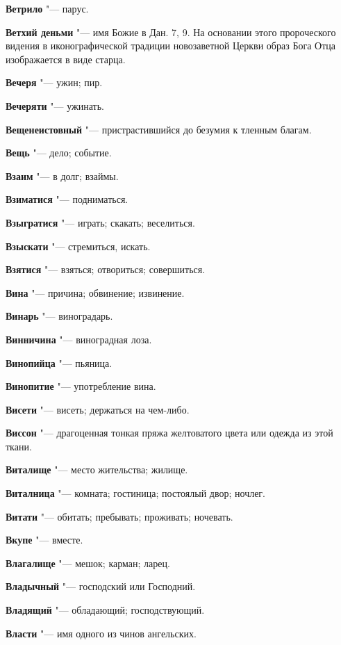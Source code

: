 \begin{mymulticols}
\noindent\textbf{Ветрило} "--- парус. 

\noindent\textbf{Ветхий деньми} "--- имя Божие в Дан. 7, 9. На основании этого пророческого видения в иконографической традиции новозаветной Церкви образ Бога Отца изображается в виде старца. 

\noindent\textbf{Вечеря} "--- ужин; пир. 

\noindent\textbf{Вечеряти} "--- ужинать. 

\noindent\textbf{Вещенеистовный} "--- пристрастившийся до безумия к тленным благам. 

\noindent\textbf{Вещь} "--- дело; событие. 

\noindent\textbf{Взаим} "--- в долг; взаймы. 

\noindent\textbf{Взиматися} "--- подниматься. 

\noindent\textbf{Взыгратися} "--- играть; скакать; веселиться. 

\noindent\textbf{Взыскати} "--- стремиться, искать. 

\noindent\textbf{Взятися} "--- взяться; отвориться; совершиться. 

\noindent\textbf{Вина} "--- причина; обвинение; извинение. 

\noindent\textbf{Винарь} "--- виноградарь. 

\noindent\textbf{Винничина} "--- виноградная лоза. 

\noindent\textbf{Винопийца} "--- пьяница. 

\noindent\textbf{Винопитие} "--- употребление вина. 

\noindent\textbf{Висети} "--- висеть; держаться на чем-либо. 

\noindent\textbf{Виссон} "--- драгоценная тонкая пряжа желтоватого цвета или одежда из этой ткани. 

\noindent\textbf{Виталище} "--- место жительства; жилище. 

\noindent\textbf{Виталница} "--- комната; гостиница; постоялый двор; ночлег. 

\noindent\textbf{Витати} "--- обитать; пребывать; проживать; ночевать. 

\noindent\textbf{Вкупе} "--- вместе. 

\noindent\textbf{Влагалище} "--- мешок; карман; ларец. 

\noindent\textbf{Владычный} "--- господский или Господний. 

\noindent\textbf{Владящий} "--- обладающий; господствующий. 

\noindent\textbf{Власти} "--- имя одного из чинов ангельских. 


\end{mymulticols}
